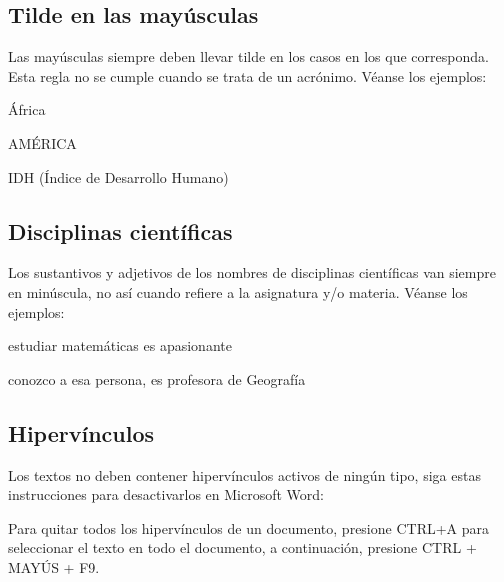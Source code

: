 \documentclass{book}
\begin{document}
{{{{{{{\subsection{Tilde en las mayúsculas}

Las mayúsculas siempre deben llevar tilde en los casos en los que corresponda. Esta regla no se cumple cuando se trata de un acrónimo. Véanse los ejemplos:

\begin{mdframed}[linewidth=.5pt,linecolor=black!30,roundcorner=3pt,backgroundcolor=yellow!15]
\begin{compactitem}
\item África
\item AMÉRICA
\item IDH (Índice de Desarrollo Humano)
\end{compactitem}
\end{mdframed}

\subsection{Disciplinas científicas}

Los sustantivos y adjetivos de los nombres de disciplinas científicas van siempre en minúscula, no así cuando refiere a la asignatura y/o materia. Véanse los ejemplos:

\begin{mdframed}[linewidth=.5pt,linecolor=black!30,roundcorner=3pt,backgroundcolor=yellow!15]
\begin{compactitem}
\item estudiar matemáticas es apasionante
\item conozco a esa persona, es profesora de Geografía
\end{compactitem}
\end{mdframed}

\subsection{Hipervínculos}

Los textos no deben contener hipervínculos activos de ningún tipo, siga estas instrucciones para desactivarlos en Microsoft Word:

\begin{mdframed}[linewidth=.5pt,linecolor=black!30,roundcorner=3pt,backgroundcolor=yellow!15]
\begin{myquote}
Para quitar todos los hipervínculos de un documento, presione CTRL+A para seleccionar el texto en todo el documento, a continuación, presione CTRL + MAYÚS + F9.
\end{myquote}
\end{mdframed}

}}}}}}}
\end{document}
